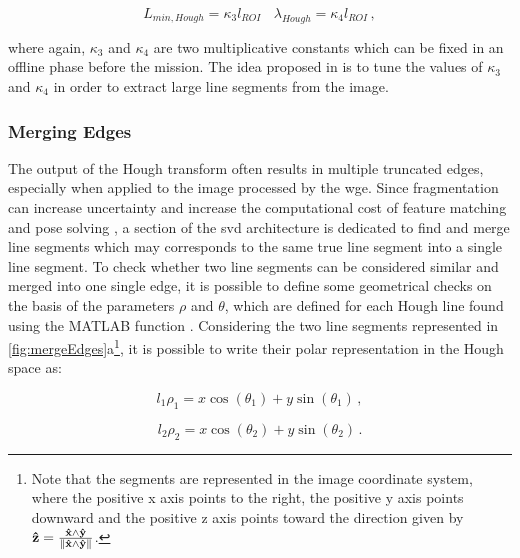 \begin{equation*}
  L_{min,Hough} = \kappa_3 l_{ROI} \ \ \ \  \lambda_{Hough} = \kappa_4 l_{ROI}  \,,
\end{equation*}

where again, $\kappa_3$ and $\kappa_4$  are two multiplicative constants which can be fixed in an offline phase before the mission. The idea proposed in \cite{Sharma2018} is to tune the values of $\kappa_3$ and $\kappa_4$ in order to extract large line segments from the image.

\subsubsection{Merging Edges}\label{sec:mergingedges}
The output of the Hough transform often results in multiple truncated edges, especially when applied to the image processed by the \acrshort{wge}. Since fragmentation can increase uncertainty and increase the computational cost of feature matching and pose solving \cite{fracchio2019}, a section of the \acrshort{svd} architecture is dedicated to find and merge line segments which may corresponds to the same true line segment into a single line segment.
To check whether two line segments can be considered similar and merged into one single edge, it is possible to define some geometrical checks on the basis of the parameters $\rho$ and $\theta$, which are defined for each Hough line found using the MATLAB function .
Considering the two line segments represented in \ref{fig:mergeEdges}a\footnote{Note that the segments are represented in the image coordinate system, where the positive x axis points to the right, the positive y axis points downward and the positive z axis points toward the direction given by $  \mathbf{\hat{z}} = \frac{\mathbf{\hat{x}} \wedge \mathbf{\hat{y}}}{\left\lVert\mathbf{\hat{x}} \wedge \mathbf{\hat{y}}\right\rVert}$.}, it is possible to write their polar representation in the Hough space as:

\begin{equation}
  l_1 \rho_1 = x \cos (\theta_1) +  y \sin (\theta_1) \,,
\end{equation}

\begin{equation}
  l_2 \rho_2 = x \cos (\theta_2) +  y \sin (\theta_2) \,.
\end{equation}

